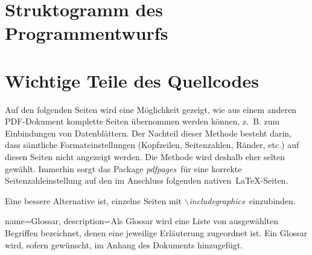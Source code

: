 \documentclass{scrbook} %
\begin{document}
\section{Struktogramm des Programmentwurfs}

\section{Wichtige Teile des Quellcodes}

\setcounter{chapter}{5}
\setcounter{section}{0}
\setcounter{table}{0}
\setcounter{figure}{0}


Auf den folgenden Seiten wird eine Möglichkeit gezeigt, wie aus einem anderen PDF-Dokument komplette Seiten übernommen werden können, z.~B. zum Einbindungen von Datenblättern. Der Nachteil dieser Methode besteht darin, dass sämtliche Formateinstellungen (Kopfzeilen, Seitenzahlen, Ränder, etc.) auf diesen Seiten nicht angezeigt werden. Die Methode wird deshalb eher selten gewählt. Immerhin sorgt das Package \textit{\glqq pdfpages\grqq}~für eine korrekte Seitenzahleinstellung auf den im Anschluss folgenden \glqq nativen\grqq~\LaTeX-Seiten.

Eine bessere Alternative ist, einzelne Seiten mit \textit{\glqq$\backslash$includegraphics\grqq}~einzubinden.



\clearpage

{
	name=Glossar,
	description={Als Glossar wird eine Liste von ausgewählten Begriffen bezeichnet, denen eine jeweilige Erläuterung zugeordnet ist. Ein Glossar wird, sofern gewünscht, im Anhang des Dokuments hinzugefügt.}
}
\end{document}
